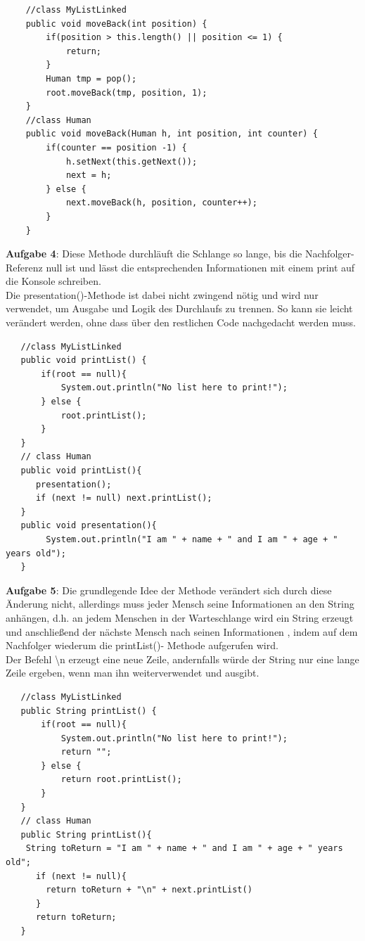 \documentclass{article}
\begin{document}
\begin{verbatim}
    //class MyListLinked
    public void moveBack(int position) {
        if(position > this.length() || position <= 1) {
            return;
        }
        Human tmp = pop();
        root.moveBack(tmp, position, 1);
    }
    //class Human 
    public void moveBack(Human h, int position, int counter) {
        if(counter == position -1) {
            h.setNext(this.getNext());
            next = h;
        } else {
            next.moveBack(h, position, counter++);
        }
    }
\end{verbatim}
\textbf{Aufgabe 4}:
Diese Methode durchläuft die Schlange so lange, bis die Nachfolger-Referenz null ist und 
lässt die entsprechenden Informationen mit einem print auf die Konsole schreiben. \\
Die presentation()-Methode ist dabei nicht zwingend nötig und wird nur verwendet, um Ausgabe 
und Logik des Durchlaufs zu trennen. So kann sie leicht verändert werden, ohne dass über den restlichen Code 
nachgedacht werden muss. 
\begin{verbatim}
   //class MyListLinked
   public void printList() {
       if(root == null){
           System.out.println("No list here to print!");
       } else {
           root.printList();
       }
   }
   // class Human 
   public void printList(){
      presentation();
      if (next != null) next.printList();
   }
   public void presentation(){
        System.out.println("I am " + name + " and I am " + age + " years old");
   }
\end{verbatim}
\textbf{Aufgabe 5}:
Die grundlegende Idee der Methode verändert sich durch diese Änderung nicht, allerdings 
muss jeder Mensch seine Informationen an den String anhängen, d.h. an jedem Menschen 
in der Warteschlange wird ein String erzeugt und anschließend der nächste Mensch 
nach seinen Informationen , indem auf dem Nachfolger wiederum die printList()-
Methode aufgerufen wird. \\
Der Befehl \textbackslash n erzeugt eine neue Zeile, andernfalls würde der String nur eine lange
Zeile ergeben, wenn man ihn weiterverwendet und ausgibt. 
\begin{verbatim}
   //class MyListLinked
   public String printList() {
       if(root == null){
           System.out.println("No list here to print!");
           return "";
       } else {
           return root.printList();
       }
   }
   // class Human 
   public String printList(){
    String toReturn = "I am " + name + " and I am " + age + " years old";
      if (next != null){
        return toReturn + "\n" + next.printList()
      } 
      return toReturn;
   }

\end{verbatim}
\end{document}
